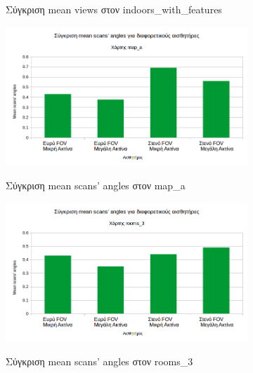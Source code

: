 \begin{figure}[H]
\begin{subfigure}[b]{0.5\textwidth}
         \label{fig:indoors_with_features_mean_views_compare}
         \caption{Σύγκριση mean views στον indoors\_with\_features}
     \end{subfigure}%
    \begin{subfigure}[b]{0.5\textwidth}
         \centering
         \includegraphics[width=\textwidth]{./images/chapter6/map_a_mean_angles_compare.png}
         \label{fig:map_a_mean_angles_compare}
         \caption{Σύγκριση mean scans' angles στον map\_a}
     \end{subfigure}
     \begin{subfigure}[b]{0.5\textwidth}
         \centering
         \includegraphics[width=\textwidth]{./images/chapter6/rooms_3_mean_angles_compare.png}
         \label{fig:rooms_3_mean_angles_compare}
         \caption{Σύγκριση mean scans' angles στον rooms\_3}
     \end{subfigure}%
     \begin{subfigure}[b]{0.5\textwidth}
         \centering

\end{subfigure}
\end{figure}
